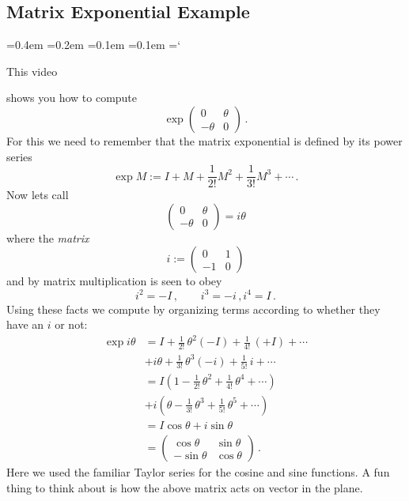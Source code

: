 
\subsection*{Matrix Exponential Example}

{\ttfamily
{}\font=0.4em
\font=0.2em
\font=0.1em
\font=0.1em
\hyphenchar\font=`\-

\hypertarget{properties_of_matrices_example}{This video} shows you
how to compute
\[
\exp\begin{pmatrix}0&\theta\\-\theta & 0\end{pmatrix}
\, .
\]
For this we need to remember that the matrix exponential is defined by its power series
\[
\exp M := I + M + \frac1{2!} M^2 + \frac1{3!} M^3+\cdots\, .
\]
Now lets call 
\[\begin{pmatrix}0&\theta\\-\theta & 0\end{pmatrix}=i\theta\]
where the {\itshape matrix} 
\[
i:=\begin{pmatrix}0&1\\-1 & 0\end{pmatrix}
\]
and by matrix multiplication is seen to obey
\[
i^2 =-I\, ,\qquad i^3=-i\, , i^4 = I\, .
\]
Using these facts we compute by organizing terms according to whether they have an $i$ or not:
\begin{align*}
\exp i\theta
&= I + \frac 1{2!}\, \theta^2 (-I) + \frac 1{4!} \,(+I) + \cdots \\
&+i \theta + \frac1{3!} \,\theta^3 (-i) + \frac 1{5!} \,i+\cdots\\[2mm]
&= I ( 1-\frac 1{2!}\, \theta^2  + \frac 1{4!}\,\theta^4  + \cdots)\\
&+i( \theta- \frac1{3!}\, \theta^3  + \frac 1{5!}\,\theta^5 +\cdots)\\[2mm]
&=I\cos\theta + i \sin\theta \\[2mm]
&=\begin{pmatrix}\cos\theta & \sin\theta \\ -\sin\theta & \cos\theta\end{pmatrix}\, .
\end{align*}
Here we used the familiar Taylor series for the cosine and sine functions. A fun thing to think about is how the above matrix
acts on vector in the plane.


} %

